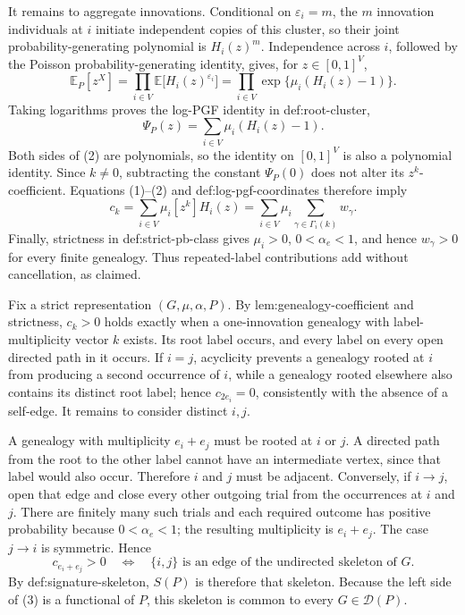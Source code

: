 It remains to aggregate innovations.  Conditional on \(\varepsilon_i=m\), the \(m\) innovation individuals at \(i\) initiate independent copies of this cluster, so their joint probability-generating polynomial is \(H_i(z)^m\).  Independence across \(i\), followed by the Poisson probability-generating identity, gives, for \(z\in[0,1]^V\),
\[
 \mathbb E_P[z^X]
 =\prod_{i\in V}\mathbb E\bigl[H_i(z)^{\varepsilon_i}\bigr]
 =\prod_{i\in V}\exp\{\mu_i(H_i(z)-1)\}.
\]
Taking logarithms proves the log-PGF identity in def:root-cluster,
\[
 \Psi_P(z)=\sum_{i\in V}\mu_i(H_i(z)-1).
\tag{2}
\]
Both sides of (2) are polynomials, so the identity on \([0,1]^V\) is also a polynomial identity.  Since \(k\ne0\), subtracting the constant \(\Psi_P(0)\) does not alter its \(z^k\)-coefficient.  Equations (1)--(2) and def:log-pgf-coordinates therefore imply
\[
 c_k
 =\sum_{i\in V}\mu_i[z^k]H_i(z)
 =\sum_{i\in V}\mu_i\sum_{\gamma\in\Gamma_i(k)}w_\gamma.
\]
Finally, strictness in def:strict-pb-class gives \(\mu_i>0\), \(0<\alpha_e<1\), and hence \(w_\gamma>0\) for every finite genealogy.  Thus repeated-label contributions add without cancellation, as claimed.

Fix a strict representation \((G,\mu,\alpha,P)\).  By lem:genealogy-coefficient and strictness, \(c_k>0\) holds exactly when a one-innovation genealogy with label-multiplicity vector \(k\) exists.  Its root label occurs, and every label on every open directed path in it occurs.  If \(i=j\), acyclicity prevents a genealogy rooted at \(i\) from producing a second occurrence of \(i\), while a genealogy rooted elsewhere also contains its distinct root label; hence \(c_{2e_i}=0\), consistently with the absence of a self-edge.  It remains to consider distinct \(i,j\).

A genealogy with multiplicity \(e_i+e_j\) must be rooted at \(i\) or \(j\).  A directed path from the root to the other label cannot have an intermediate vertex, since that label would also occur.  Therefore \(i\) and \(j\) must be adjacent.  Conversely, if \(i\to j\), open that edge and close every other outgoing trial from the occurrences at \(i\) and \(j\).  There are finitely many such trials and each required outcome has positive probability because \(0<\alpha_e<1\); the resulting multiplicity is \(e_i+e_j\).  The case \(j\to i\) is symmetric.  Hence
\[
 c_{e_i+e_j}>0
 \quad\Longleftrightarrow\quad
 \{i,j\}\text{ is an edge of the undirected skeleton of }G.
\tag{3}
\]
By def:signature-skeleton, \(S(P)\) is therefore that skeleton.  Because the left side of (3) is a functional of \(P\), this skeleton is common to every \(G\in\mathcal D(P)\).

